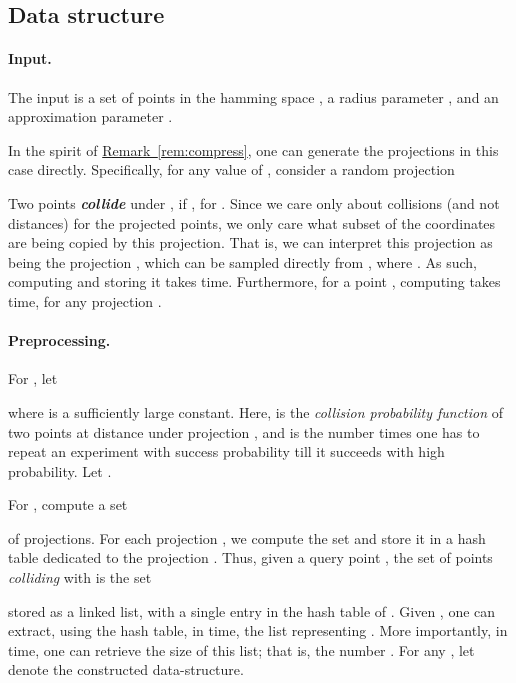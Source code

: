 \documentclass[12pt]{article}\usepackage[cm]{fullpage}
\newcommand{\emphic}[2]{\textcolor{blue25}{\textbf{\emph{#1}}}\index{#2}}
\renewcommand{\emphic}[2]{\textbf{\emph{#1}}}
\newcommand{\emphi}[1]{\emphic{#1}{#1}}
\theoremstyle{remark}\theoremheaderfont{\sf}\theorembodyfont{\upshape}\newtheorem{defn}[theorem]{Definition}
\numberwithin{figure}{section}\numberwithin{table}{section}\numberwithin{equation}{section}
\newcommand{\HLink}[2]{\hyperref[#2]{#1~\ref*{#2}}}
\newcommand{\remref}[1]{\HLink{Remark}{rem:#1}}
\begin{document}
\subsection{Data structure}

\paragraph{Input.}

The input is a set  of  points in the hamming space
, a radius parameter , and an approximation
parameter .

\begin{remark:unnumbered}
    In the spirit of \remref{compress}, one can generate the
    projections in this case directly.  Specifically, for any value of
    , consider a random projection
    
    Two points  \emphi{collide} under , if
    , for . Since we
    care only about collisions (and not distances) for the projected
    points, we only care what subset of the coordinates are being
    copied by this projection. That is, we can interpret this
    projection as being the projection , which can
    be sampled directly from , where .
    As such, computing  and storing it takes 
    time. Furthermore, for a point , computing
     takes  time, for any projection
    .
\end{remark:unnumbered}

\paragraph{Preprocessing.}

For , let

where  is a sufficiently large constant.  Here,  is
the \emph{collision probability function} of two points at distance
 under projection , and  is
the number times one has to repeat an experiment with success
probability  till it succeeds with high probability.
Let .

For , compute a set

of projections.  For each projection , we
compute the set  and store it in a hash table
dedicated to the projection . Thus, given a query point
, the set of points \emph{colliding} with  is
the set

stored as a linked list, with a single entry in the hash table of
.  Given , one can extract, using the hash table, in
 time, the list representing .  More
importantly, in  time, one can retrieve the size of this list;
that is, the number .  For any
, let  denote the constructed data-structure.
\end{document}
